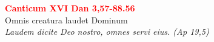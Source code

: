 


\def\greinitialformat#1{%
{\fontsize{39}{39}\selectfont #1}%
}




\vspace{0.3cm}
\begin{center}
 \textcolor{red}{\large \bf Canticum XVI Dan 3,57-88.56}\\
Omnis creatura laudet Dominum\\
\textit{\small Laudem dicite Deo nostro, omnes servi eius. (Ap 19,5)}
\end{center}
